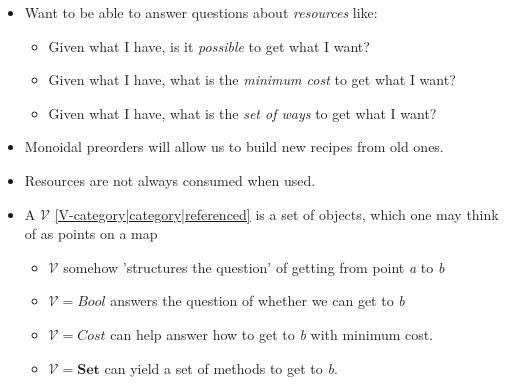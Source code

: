 \begin{itemize}
    \item Want to be able to answer questions about \emph{resources} like:
          \begin{itemize}
            \item Given what I have, is it \emph{possible} to get what I want?
            \item Given what I have, what is the \emph{minimum cost} to get what I want?
            \item Given what I have, what is the \emph{set of ways} to get what I want?\end{itemize}
    \item Monoidal preorders will allow us to build new recipes from old ones.
    \item Resources are not always consumed when used.
    \item  A $\mathcal{V}$ \ref{V-category|category|referenced} is a set of objects, which one may think of as points on a map
          \begin{itemize}
            \item  $\mathcal{V}$ somehow 'structures the question' of getting from point \emph{a} to \emph{b}
            \item  $\mathcal{V} = Bool$ answers the question of whether we can get to \emph{b}
            \item  $\mathcal{V} = Cost$ can help answer how to get to \emph{b} with minimum cost.
            \item  $\mathcal{V} = \mathbf{Set}$ can yield a set of methods to get to \emph{b}.\end{itemize}
  \end{itemize}
